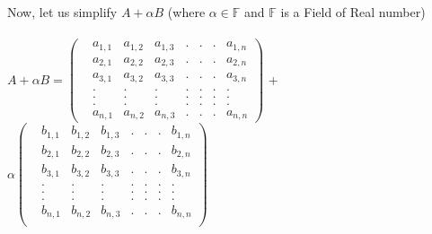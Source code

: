 \documentclass[45pt]{article}
\begin{document}
\begin{enumerate}
Now, let us simplify $A+ \alpha B$ (where $\alpha \in \mathbb{F}$ and $\mathbb{F}$ is a Field of Real number)\\\\
$A+ \alpha B =\begin{pmatrix}
    & a_{1,1} & a_{1,2} & a_{1,3} &.&.&.& a_{1,n}  \\
    & a_{2,1} & a_{2,2} & a_{2,3} &.&.&.& a_{2,n}  \\
    & a_{3,1} & a_{3,2} & a_{3,3} &.&.&.& a_{3,n}  \\
    & . & . & . &.&.&.&.\\
    & . & . & . &.&.&.&.\\
    & . & . & . &.&.&.&.\\
    & a_{n,1} & a_{n,2} & a_{n,3} &.&.&.& a_{n,n}
    \end{pmatrix}$ +
    $\alpha \begin{pmatrix}
        & b_{1,1} & b_{1,2} & b_{1,3} &.&.&.& b_{1,n}  \\
        & b_{2,1} & b_{2,2} & b_{2,3} &.&.&.& b_{2,n}  \\
        & b_{3,1} & b_{3,2} & b_{3,3} &.&.&.& b_{3,n}  \\
        & . & . & . &.&.&.&.\\
        & . & . & . &.&.&.&.\\
        & . & . & . &.&.&.&.\\
        & b_{n,1} & b_{n,2} & b_{n,3} &.&.&.& b_{n,n}  \\
     \end{pmatrix}
    $\\\\


\end{enumerate}
\end{document}
